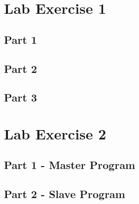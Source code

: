\begin{appendices}
	\label{Appendix:start}
	\section{Lab Exercise 1}
	{
		\subsection{Part 1}
		{
			\label{appendix:ex1-1}
			
		}
		\subsection{Part 2}
		{
			\label{appendix:ex1-2}
			
		}
		\subsection{Part 3}
		{
			\label{appendix:ex1-3}
			
		}
	}
	\section{Lab Exercise 2}
	{
		\label{appendix:ex2}
		\subsection{Part 1 - Master Program}
		{
			\label{appendix:ex2-1}
			
		}
		\subsection{Part 2 - Slave Program}
		{
			\label{appendix:ex2-2}
			
		}
	}

\end{appendices}